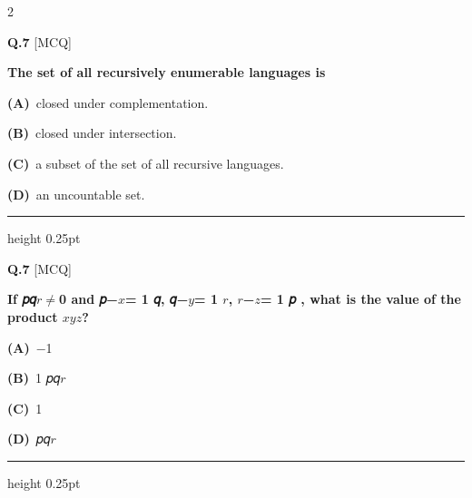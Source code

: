 \documentclass[a4paper,10pt,twoside]{article}
\begin{document}
\begin{multicols}{2}
\vspace{6pt}
\vspace{3pt}

\noindent\textbf{Q.7} \hfill {\footnotesize\textsf{[MCQ]}}
\par\vspace{2pt}
{\bfseries The set of all recursively enumerable languages is \par}
\par\vspace{2pt}\noindent
\textbf{(A)}~closed under complementation.\par\vspace{2pt}\noindent
\textbf{(B)}~closed under intersection.\par\vspace{2pt}\noindent
\textbf{(C)}~a subset of the set of all recursive languages.\par\vspace{2pt}\noindent
\textbf{(D)}~an uncountable set.
\par\vspace{6pt}\hrule height 0.25pt\vspace{6pt}

\vspace{6pt}
\vspace{3pt}

\noindent\textbf{Q.7} \hfill {\footnotesize\textsf{[MCQ]}}
\par\vspace{2pt}
{\bfseries If 𝑝𝑞$r$$\ne$0 and 𝑝−$x$=
1
𝑞, 𝑞−$y$=
1
$r$, $r$−$z$=
1
𝑝 , what is the value of the product $x$$y$$z$? \par}
\par\vspace{2pt}\noindent
\textbf{(A)}~−1\par\vspace{2pt}\noindent
\textbf{(B)}~1 \newline 𝑝𝑞$r$\par\vspace{2pt}\noindent
\textbf{(C)}~1\par\vspace{2pt}\noindent
\textbf{(D)}~𝑝𝑞$r$
\par\vspace{6pt}\hrule height 0.25pt\vspace{6pt}

\vspace{6pt}
\vspace{3pt}


\end{multicols}
\end{document}

